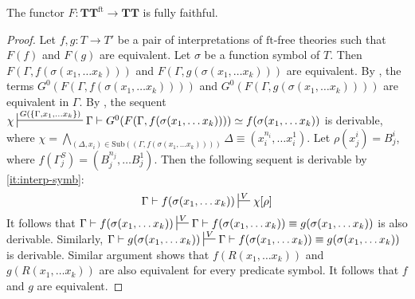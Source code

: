 \documentclass[reqno]{amsart}
\theoremstyle{definition}
\theoremstyle{remark}
\newcommand{\fs}[1]{\mathrm{#1}}
\newcommand{\ft}{\fs{ft}}
\newcommand{\sub}{\fs{Sub}}
\newcommand{\cat}[1]{\mathbf{#1}}
\newcommand{\algtt}{\cat{TT}}
\numberwithin{figure}{section}
\begin{document}
\begin{thm}
The functor $F : \algtt^\ft \to \algtt$ is fully faithful.
\end{thm}
\begin{proof}
Let $f,g : T \to T'$ be a pair of interpretations of $\ft$-free theories such that $F(f)$ and $F(g)$ are equivalent.
Let $\sigma$ be a function symbol of $T$.
Then $F(\Gamma, f(\sigma(x_1, \ldots x_k)))$ and $F(\Gamma, g(\sigma(x_1, \ldots x_k)))$ are equivalent.
By , the terms $G^0(F(\Gamma, f(\sigma(x_1, \ldots x_k))))$ and $G^0(F(\Gamma, g(\sigma(x_1, \ldots x_k))))$ are equivalent in $\Gamma$.
By , the sequent $\chi \sststile{}{G(\{ \Gamma, x_1, \ldots x_k \})} \Gamma \vdash G^0(F(\Gamma, f(\sigma(x_1, \ldots x_k)))) \simeq f(\sigma(x_1, \ldots x_k))$ is derivable,
where $\chi = \bigwedge_{(\Delta,x_i) \in \sub((\Gamma,f(\sigma(x_1, \ldots x_k))))} \Delta \equiv (x^{n_i}_i, \ldots x^1_i)$.
Let $\rho(x_j^i) = B_j^i$, where $f(\Gamma^S_j) = (B^{n_j}_j, \ldots B^1_j)$.
Then the following sequent is derivable by \eqref{it:interp-symb}:
\[ \Gamma \vdash f(\sigma(x_1, \ldots x_k)) \sststile{}{V} \chi[\rho] \]
It follows that $\Gamma \vdash f(\sigma(x_1, \ldots x_k)) \sststile{}{V} \Gamma \vdash f(\sigma(x_1, \ldots x_k)) \equiv g(\sigma(x_1, \ldots x_k))$ is also derivable.
Similarly, $\Gamma \vdash g(\sigma(x_1, \ldots x_k)) \sststile{}{V} \Gamma \vdash f(\sigma(x_1, \ldots x_k)) \equiv g(\sigma(x_1, \ldots x_k))$ is derivable.
Similar argument shows that $f(R(x_1, \ldots x_k))$ and $g(R(x_1, \ldots x_k))$ are also equivalent for every predicate symbol.
It follows that $f$ and $g$ are equivalent.


\end{proof}
\end{document}
